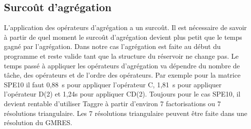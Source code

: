 \subsection{Surcoût d'agrégation}
L'application des opérateurs d'agrégation a un surcoût.
%
Il est nécessaire de savoir à partir de quel moment le surcoût d'agrégation devient plus petit que le temps gagné par l'agrégation.
%
Dans notre cas l'agrégation est faite au début du programme et reste valide tant que la structure du réservoir ne change pas.
%
Le temps passé à appliquer les opérateurs d'agrégation va dépendre du nombre de tâche, des opérateurs et de l'ordre des opérateurs.
%
Par exemple pour la matrice SPE10 il faut 0,88~s pour appliquer l'opérateur C, 1,81~s pour appliquer l'opérateur D(2) et 1,24s pour appliquer CD(2).
%
Toujours pour le cas SPE10, il devient rentable d'utiliser Taggre à partir d'environ 7 factorisations ou 7 résolutions triangulaire.
%
Les 7 résolutions triangulaire peuvent être faite dans une résolution du GMRES.
